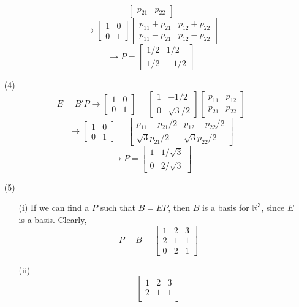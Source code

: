 \documentclass[12pt]{article}
\begin{document}
\begin{itemize}
$$\begin{bmatrix}
p_{21} & p_{22}
\end{bmatrix}$$
$$\rightarrow \begin{bmatrix}
1 & 0 \\
0 & 1
\end{bmatrix}\begin{bmatrix}
p_{11} + p_{21} & p_{12} + p_{22} \\
p_{11} - p_{21} & p_{12} - p_{22}
\end{bmatrix}$$
$$\rightarrow P = \begin{bmatrix}
1/2 & 1/2 \\
1/2 & -1/2
\end{bmatrix}$$
\item[(4)]
$$E = B'P \rightarrow \begin{bmatrix}
1 & 0 \\
0 & 1
\end{bmatrix} = \begin{bmatrix}
1 & -1/2 \\
0 & \sqrt{3}/2
\end{bmatrix}\begin{bmatrix}
p_{11} & p_{12} \\
p_{21} & p_{22}
\end{bmatrix}$$
$$\rightarrow \begin{bmatrix}
1 & 0 \\
0 & 1
\end{bmatrix} = \begin{bmatrix}
p_{11} - p_{21}/2 & p_{12} - p_{22}/2 \\
\sqrt{3}p_{21}/2 & \sqrt{3}p_{22}/2
\end{bmatrix}$$
$$\rightarrow P = \begin{bmatrix}
1 & 1/\sqrt{3} \\
0 & 2/\sqrt{3}
\end{bmatrix}$$
\item[(5)]
\begin{itemize}
\item[(i)]
If we can find a $P$ such that $B = EP$, then $B$ is a basis for $\mathbb{R}^3$, since $E$ is a basis. Clearly, $$P = B = \begin{bmatrix}
1 & 2 & 3 \\
2 & 1 & 1 \\
0 & 2 & 1
\end{bmatrix}$$
\item[(ii)]
$$ \begin{bmatrix}
1 & 2 & 3 \\
2 & 1 & 1 \\

\end{bmatrix}$$
\end{itemize}
\end{itemize}
\end{document}

